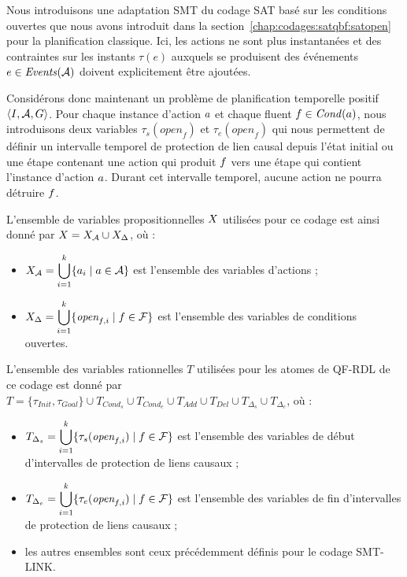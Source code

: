 Nous introduisons une adaptation SMT du codage SAT basé sur les conditions ouvertes que nous avons introduit dans la section~\ref{chap:codages:satqbf:satopen} pour la planification classique. Ici, les actions ne sont plus instantanées et des contraintes sur les instants $\tau(e)$ auxquels se produisent des événements $e\in\mathit{Events}(\mathcal{A})$ doivent explicitement être ajoutées.


Considérons donc maintenant un problème de planification temporelle positif $\langle I, \mathcal{A}, G \rangle$.
Pour chaque instance d'action $a$ et chaque fluent $f\in \mathit{Cond}(a)$, nous introduisons deux variables $\tau_{s}(\textit{open}_{f})$ et $\tau_{e}(\textit{open}_{f})$ qui nous permettent de définir un intervalle temporel de protection de lien causal depuis l'état initial ou une étape contenant une action qui produit $f$ vers une étape qui contient l'instance d'action $a$. Durant cet intervalle temporel, aucune action ne pourra détruire $f$.


L'ensemble de variables propositionnelles $X$ utilisées pour ce codage est ainsi donné par $X = X_{\mathcal{A}} \cup X_{\Delta}$, où :
\begin{itemize}
    \item $\displaystyle X_{\mathcal{A}}=\bigcup_{i=1}^{k}\{a_{i}\mid a\in\mathcal{A}\}$ est l'ensemble des variables d'actions ;
    \item $\displaystyle X_{\Delta}=\bigcup_{i=1}^{k}\{\textit{open}_{f,i}\mid f\in\mathcal{F}\}$ est l'ensemble des variables de conditions ouvertes.
\end{itemize}

L'ensemble des variables rationnelles $T$ utilisées pour les atomes de QF-RDL de ce codage est donné par $\displaystyle T=\{\tau_{\mathit{Init}}, \tau_{\mathit{Goal}}\} \cup T_{\mathit{Cond_{s}}} \cup T_{\mathit{Cond_{e}}} \cup T_{\mathit{Add}} \cup T_{\mathit{Del}} \cup T_{\Delta_{s}} \cup T_{\Delta_{e}}$, où :

\begin{itemize}
    \item $\displaystyle T_{\Delta_{s}}=\bigcup_{i=1}^{k}\{\tau_{s}(\textit{open}_{f,i})\mid f\in\mathcal{F}\}$ est l'ensemble des variables de début d'intervalles de protection de liens causaux ;
    \item $\displaystyle T_{\Delta_{e}}=\bigcup_{i=1}^{k}\{\tau_{e}(\textit{open}_{f,i})\mid f\in\mathcal{F}\}$ est l'ensemble des variables de fin d'intervalles de protection de liens causaux ;
    \item les autres ensembles sont ceux précédemment définis pour le codage SMT-LINK.
\end{itemize}


